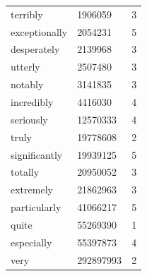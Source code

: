 \begin{table}[hbt]
\begin{center}
\begin{tabular}{llc}
    terribly & 1906059 & 3 \\
    exceptionally & 2054231 & 5 \\
    desperately & 2139968 & 3 \\
    utterly & 2507480 & 3 \\
    notably & 3141835 & 3 \\
    incredibly & 4416030 & 4 \\
    seriously & 12570333 & 4 \\
    truly & 19778608 & 2 \\
    significantly & 19939125 & 5 \\
    totally & 20950052 & 3 \\
    extremely & 21862963 & 3 \\
    particularly & 41066217 & 5 \\
    quite & 55269390 & 1 \\
    especially & 55397873 & 4 \\
    very & 292897993 & 2
  \end{tabular}
 \end{center}
\end{table}




